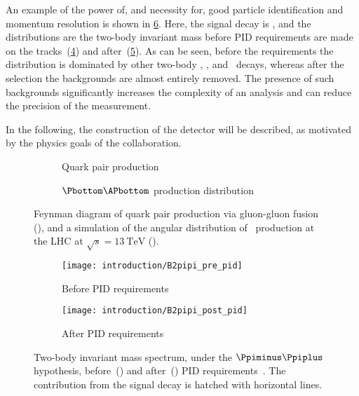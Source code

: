 An example of the power of, and necessity for, good particle identification and 
momentum resolution is shown in \cref{fig:intro:lhcb:pid_power}.
Here, the signal decay is \decay{\PBzero}{\pippim}, and the distributions are 
the two-body invariant mass before \ac{PID} requirements are made on the 
tracks~(\ref{fig:intro:lhcb:pid_power:pre}) and 
after~(\ref{fig:intro:lhcb:pid_power:post}).
As can be seen, before the requirements the distribution is dominated by other 
two-body \PBzero, \PBs, and \PLambdab\ decays, whereas after the selection the 
backgrounds are almost entirely removed.
The presence of such backgrounds significantly increases the complexity of an 
analysis and can reduce the precision of the measurement.

In the following, the construction of the detector will be described, as 
motivated by the physics goals of the collaboration.

\begin{figure}
  \begin{subfigure}[b]{0.4\textwidth}
    \centering
    
    \caption{Quark pair production}
    \label{fig:intro:lhcb:hf_production:gg_fusion}
  \end{subfigure}
  \begin{subfigure}[b]{0.6\textwidth}
    
    \caption{$\Pbottom\APbottom$ production distribution}
    \label{fig:intro:lhcb:hf_production:bbbar_angles}
  \end{subfigure}
  \caption{%
    Feynman diagram of quark pair production via gluon-gluon fusion 
    (), and a simulation of the 
    angular distribution of \bbbar\ production at the \ac{LHC} at $\sqrt{s} = 
    \SI{13}{\TeV}$ ().
  }
  \label{fig:intro:lhcb:hf_production}
\end{figure}

\begin{figure}
  \begin{subfigure}[b]{0.5\textwidth}
    \centering
    \texttt{[image: introduction/B2pipi\_pre\_pid]}
    \caption{Before \ac{PID} requirements}
    \label{fig:intro:lhcb:pid_power:pre}
  \end{subfigure}
  \begin{subfigure}[b]{0.5\textwidth}
    \centering
    \texttt{[image: introduction/B2pipi\_post\_pid]}
    \caption{After \ac{PID} requirements}
    \label{fig:intro:lhcb:pid_power:post}
  \end{subfigure}
  \caption{%
    Two-body invariant mass spectrum, under the $\pimpip$ hypothesis, 
    before~() and 
    after~() \ac{PID} 
    requirements~\cite{Aaij:2012as}.
    The contribution from the signal decay is hatched with horizontal lines.
  }
  \label{fig:intro:lhcb:pid_power}
\end{figure}

